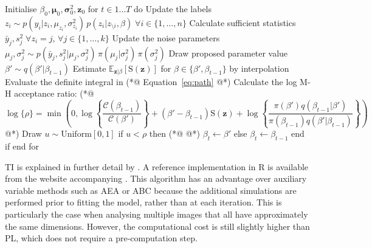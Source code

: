 \documentclass[nojss,shortnames]{jss}\usepackage[]{graphicx}\usepackage[]{color}
\begin{document}
\begin{algorithm}[float,caption={Path sampling (TI)}, label={alg:path}]
Initialise $\beta_0, \boldsymbol\mu_0, \boldsymbol\sigma^2_0, \mathbf{z}_0$
for $t \in 1\dots T$ do
  Update the labels $z_i \sim p(y_i | z_i, \mu_{z_i}, \sigma^2_{z_i}) \,p(z_i | z_{\setminus i}, \beta) \; \forall i \in \{ 1, \dots, n\}$
  Calculate sufficient statistics $\bar{y}_j, s^2_j \; \forall z_i = j, \, \forall j \in \{ 1, \dots, k\}$
  Update the noise parameters $\mu_j, \sigma^2_j \sim p(\bar{y}_j, s^2_j | \mu_j, \sigma_j^2) \,\pi(\mu_j | \sigma^2_j) \, \pi(\sigma^2_j)$
  Draw proposed parameter value $\beta' \sim q(\beta' | \beta_{t-1})$
  Estimate $\mathbb{E}_{\mathbf{z} | \beta}[\mathrm{S}(\mathbf{z})]$ for $\beta \in \{ \beta', \beta_{t-1}\}$ by interpolation
  Evaluate the definite integral in (*@ Equation~\eqref{eq:path} @*)
  Calculate the log M-H acceptance ratio: (*@
  \begin{equation}
  \label{eq:mhRatio_path}
  \log\{\rho\} = \min\left( 0, \log\left\{\frac{\mathcal{C}(\beta_{t-1})}{\mathcal{C}(\beta')}\right\} + (\beta' - \beta_{t-1})\mathrm{S}(\mathbf{z}) + \log\left\{\frac{\pi(\beta') q(\beta_{t-1} | \beta')}{\pi(\beta_{t-1}) q(\beta' | \beta_{t-1})}\right\} \right)
  \end{equation} @*)
  Draw $u \sim \mathrm{Uniform}[0,1]$
  if $u < \rho$ then (*@ \label{mh:accept} @*)
    $\beta_t \gets \beta'$ 
  else
    $\beta_t \gets \beta_{t-1}$ 
  end if
end for
\end{algorithm}

TI is explained in further detail by \citet[chap. 5]{Chen2000}. A reference implementation in R is available from the website accompanying \citet{Marin2007}. This algorithm has an advantage over auxiliary variable methods such as AEA or ABC because the additional simulations are performed prior to fitting the model, rather than at each iteration. This is particularly the case when analysing multiple images that all have approximately the same dimensions. However, the computational cost is still slightly higher than PL, which does not require a pre-computation step.
\end{document}
